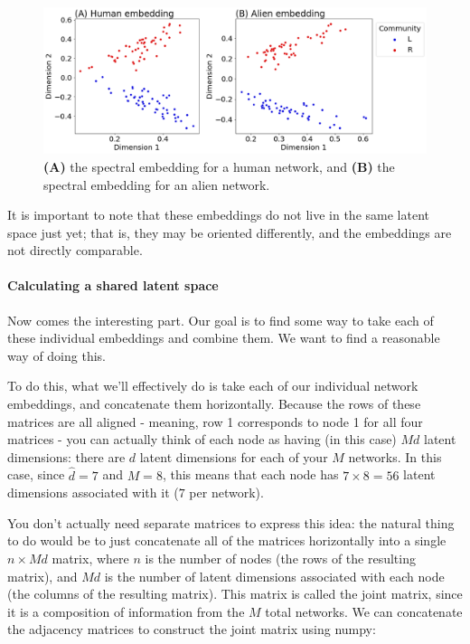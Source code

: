 \begin{figure}[h]
    \centering
    \includegraphics[width=0.8\linewidth]{representations/ch6/Images/mase_ase.png}
    \caption[\texttt{mase} \texttt{ase} step]{\textbf{(A)} the spectral embedding for a human network, and \textbf{(B)} the spectral embedding for an alien network.}
    \label{fig:ch6:multinet:mase:ase}
\end{figure}

It is important to note that these embeddings do not live in the same latent space just yet; that is, they may be oriented differently, and the embeddings are not directly comparable.

\paragraph*{Calculating a shared latent space}

Now comes the interesting part. Our goal is to find some way to take each of these individual embeddings and combine them. We want to find a reasonable way of doing this.

To do this, what we'll effectively do is take each of our individual network embeddings, and concatenate them horizontally. Because the rows of these matrices are all aligned - meaning, row 1 corresponds to node 1 for all four matrices - you can actually think of each node as having (in this case) $Md$ latent dimensions: there are $d$ latent dimensions for each of your $M$ networks. In this case, since $\hat d = 7$ and $M = 8$, this means that each node has $7 \times 8 = 56$ latent dimensions associated with it ($7$ per network).

You don't actually need separate matrices to express this idea: the natural thing to do would be to just concatenate all of the matrices horizontally into a single $n \times Md$ matrix, where $n$ is the number of nodes (the rows of the resulting matrix), and $Md$ is the number of latent dimensions associated with each node (the columns of the resulting matrix). This matrix is called the joint matrix, since it is a composition of information from the $M$ total networks. We can concatenate the adjacency matrices to construct the joint matrix using numpy:

